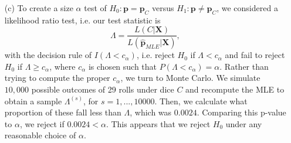 \documentclass[11pt]{article}
\begin{document}
\begin{itemize}
\item[(c)]  To create a size $\alpha$ test of $H_0\colon \mathbf{p} = \mathbf{p}_C$ versus $H_1\colon \mathbf{p}\not= \mathbf{p}_C$, we considered a likelihood ratio test, i.e. our test statistic is
\[
\Lambda = \frac{L(C|\mathbf{X})}{L(\widehat{\mathbf{p}}_{MLE}|\mathbf{X})},
\]
with the decision rule of $I(\Lambda < c_{\alpha})$, i.e. reject $H_0$ if $\Lambda < c_\alpha$ and fail to reject $H_0$ if $\Lambda \geq c_\alpha$, where $c_\alpha$ is chosen such that $P(\Lambda < c_\alpha) = \alpha$.  Rather than trying to compute the proper $c_\alpha$, we turn to Monte Carlo.  We simulate $10,000$ possible outcomes of 29 rolls under dice $C$ and recompute the MLE to obtain a sample $\Lambda^{(s)}$, for $s=1,...,10000$.  Then, we calculate what proportion of these fall less than $\Lambda$, which was $0.0024$.  Comparing this p-value to $\alpha$, we reject if $0.0024 < \alpha$.  This appears that we reject $H_0$ under any reasonable choice of $\alpha$.
\end{itemize}
\end{document}
